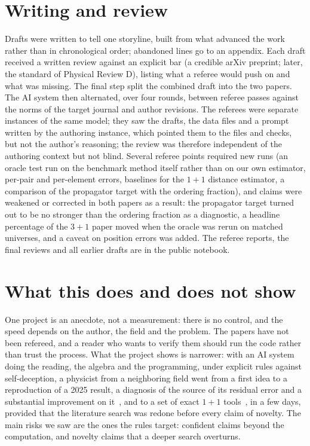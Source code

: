 \documentclass[11pt,a4paper]{article}
\begin{document}
\section{Writing and review}
Drafts were written to tell one storyline, built from what advanced the work rather than in chronological order; abandoned lines go to an appendix. Each draft received a written review against an explicit bar (a credible arXiv preprint; later, the standard of Physical Review D), listing what a referee would push on and what was missing. The final step split the combined draft into the two papers. The AI system then alternated, over four rounds, between referee passes against the norms of the target journal and author revisions. The referees were separate instances of the same model; they saw the drafts, the data files and a prompt written by the authoring instance, which pointed them to the files and checks, but not the author's reasoning; the review was therefore independent of the authoring context but not blind. Several referee points required new runs (an oracle test run on the benchmark method itself rather than on our own estimator, per-pair and per-element errors, baselines for the $1+1$ distance estimator, a comparison of the propagator target with the ordering fraction), and claims were weakened or corrected in both papers as a result: the propagator target turned out to be no stronger than the ordering fraction as a diagnostic, a headline percentage of the $3+1$ paper moved when the oracle was rerun on matched universes, and a caveat on position errors was added. The referee reports, the final reviews and all earlier drafts are in the public notebook.

\section{What this does and does not show}
One project is an anecdote, not a measurement: there is no control, and the speed depends on the author, the field and the problem. The papers have not been refereed, and a reader who wants to verify them should run the code rather than trust the process. What the project shows is narrower: with an AI system doing the reading, the algebra and the programming, under explicit rules against self-deception, a physicist from a neighboring field went from a first idea to a reproduction of a 2025 result, a diagnosis of the source of its residual error and a substantial improvement on it~\cite{Embedding}, and to a set of exact $1+1$ tools~\cite{Toolkit}, in a few days, provided that the literature search was redone before every claim of novelty. The main risks we saw are the ones the rules target: confident claims beyond the computation, and novelty claims that a deeper search overturns.
\end{document}
